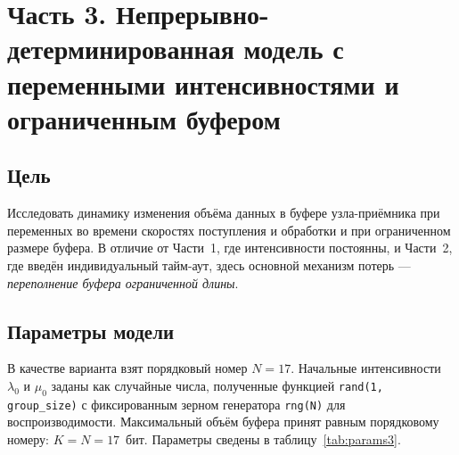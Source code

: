 \documentclass[a4paper,12pt]{article}
\begin{document}
%

\newpage
\section*{Часть 3. Непрерывно-детерминированная модель с переменными интенсивностями и ограниченным буфером}

\subsection*{Цель}
Исследовать динамику изменения объёма данных в буфере узла-приёмника при переменных
во времени скоростях поступления и обработки и при ограниченном размере буфера.
В отличие от Части~1, где интенсивности постоянны, и Части~2, где введён индивидуальный
тайм-аут, здесь основной механизм потерь --- \emph{переполнение буфера ограниченной длины}.

\subsection*{Параметры модели}
В качестве варианта взят порядковый номер $N=17$. Начальные интенсивности $\lambda_{0}$
и $\mu_{0}$ заданы как случайные числа, полученные функцией \verb|rand(1, group_size)|
с фиксированным зерном генератора \verb|rng(N)| для воспроизводимости. Максимальный
объём буфера принят равным порядковому номеру: $K = N = 17$~бит. Параметры сведены
в таблицу~\ref{tab:params3}.
\end{document}
